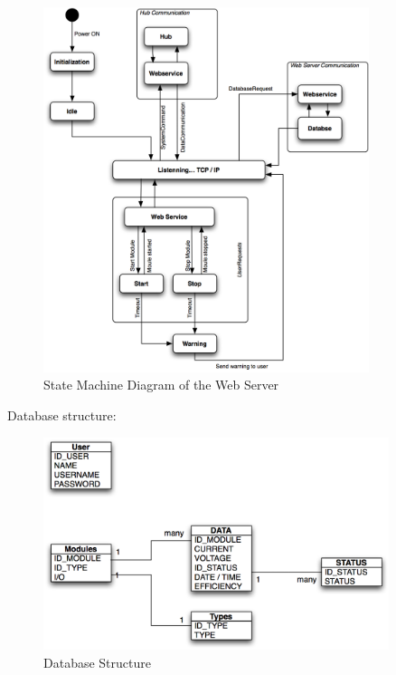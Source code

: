 	\begin{figure}[H]
		\begin{centering}
			 \includegraphics[width=0.85\textwidth]{images/state_web.png}
		\caption{State Machine Diagram of the Web Server}
	 	\end{centering}
	\end{figure}
	
	Database structure:\p
	\begin{figure}[H]
		\begin{centering}
			 \includegraphics[width=0.9\textwidth]{images/db_prop.png}
		\caption{Database Structure}
	 	\end{centering}
	\end{figure}


